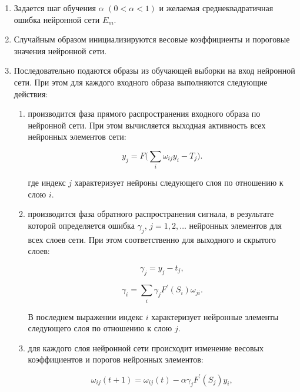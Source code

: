 \begin{enumerate}[wide, labelindent=10mm]
    \item Задается шаг обучения $\alpha$ $(0 < \alpha < 1)$ и желаемая среднеквадратичная ошибка нейронной сети $E_m$.

    \item Случайным образом инициализируются весовые коэффициенты и пороговые значения нейронной сети.

    \item Последовательно подаются образы из обучающей выборки на вход нейронной сети. При этом для каждого входного образа выполняются следующие действия:

    \begin{enumerate}[wide, labelindent=20mm]
        \item производится фаза прямого распространения входного образа по нейронной сети. При этом вычисляется выходная активность всех нейронных элементов сети:

        \begin{equation}
            y_j = F(\sum_{i}{\omega_{i j}y_i - T_j)}.
        \end{equation}

        где индекс $j$ характеризует нейроны следующего слоя по отношению к слою $i$.

        \item производится фаза обратного распространения сигнала, в результате которой определяется ошибка $\gamma_j$, $j = 1, 2, \ldots$ нейронных элементов для всех слоев сети. При этом соответственно для выходного и скрытого слоев:

        \begin{equation}
            \gamma_j = y_j - t_j,
        \end{equation}

        \begin{equation}
            \gamma_i = \sum_{i}{\gamma_jF^\prime(S_i)\omega_{j i}}.
        \end{equation}

        В последнем выражении индекс $i$ характеризует нейронные элементы следующего слоя по отношению к слою $j$.

        \item для каждого слоя нейронной сети происходит изменение весовых коэффициентов и порогов нейронных элементов:

        \begin{equation}
            \omega_{i j}(t + 1) = \omega_{i j}(t) - \alpha\gamma_jF^\prime(S_j)y_i,
        \end{equation}


\end{enumerate}
\end{enumerate}
